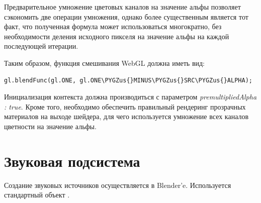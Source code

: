 \documentclass[a4paper,12pt,oneside]{sphinxmanual}
\def\PYGZus{\char`\_}
\begin{document}
Предварительное умножение цветовых каналов на значение альфы позволяет сэкономить две операции умножения, однако более существенным является тот факт, что полученная формула может использоваться многократно, без необходимости деления исходного пикселя на значение альфы на каждой последующей итерации.

Таким образом, функция смешивания WebGL должна иметь вид:

\begin{Verbatim}[commandchars=\\\{\}]
gl.blendFunc(gl.ONE, gl.ONE\PYGZus{}MINUS\PYGZus{}SRC\PYGZus{}ALPHA);
\end{Verbatim}

Инициализация контекста должна производиться с параметром \emph{premultipliedAlpha : true}. Кроме того, необходимо обеспечить правильный рендеринг прозрачных материалов на выходе шейдера, для чего используется умножение всех каналов цветности на значение альфы.


\chapter{Звуковая подсистема}
\label{audio:audio}\label{audio::doc}\label{audio:id1}
Создание звуковых источников осуществляется в Blender'e. Используется стандартный объект .
\end{document}
